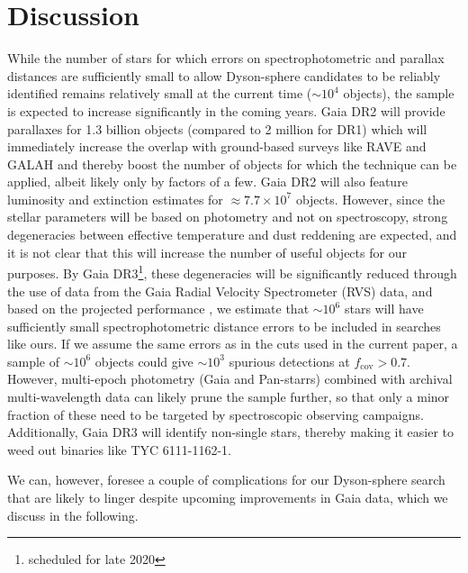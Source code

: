 \documentclass[twocolumn]{aastex6}
\begin{document}
\section{Discussion}
\label{discussion}
While the number of stars for which errors on spectrophotometric and parallax distances are sufficiently small to allow Dyson-sphere candidates to be reliably identified remains relatively small at the current time ($\sim 10^4$ objects), the sample is expected to increase significantly in the coming years. Gaia DR2 will provide parallaxes for 1.3 billion objects (compared to 2 million for DR1) which will immediately increase the overlap with ground-based surveys like RAVE and GALAH and thereby boost the number of objects for which the technique can be applied, albeit likely only by factors of a few. Gaia DR2 will also feature luminosity and extinction estimates for $\approx 7.7\times 10^7$ objects. However, since the stellar parameters will be based on photometry and not on spectroscopy, strong degeneracies between effective temperature and dust reddening are expected, and it is not clear that this will increase the number of useful objects for our purposes. By Gaia DR3\footnote{scheduled for late 2020}, these degeneracies will be significantly reduced through the use of data from the Gaia Radial Velocity Spectrometer (RVS) data, and based on the projected performance \citep{Recio_Blanco16,Dafonte16}, we estimate that $\sim 10^6$ stars will have sufficiently small spectrophotometric distance errors to be included in searches like ours. If we assume the same errors as in the cuts used in the current paper, a sample of $\sim 10^6$ objects could give $\sim 10^3$ spurious detections at $f_\mathrm{cov}>0.7$. However, multi-epoch photometry (Gaia and Pan-starrs) combined with archival multi-wavelength data can likely prune the sample further, so that only a minor fraction of these need to be targeted by spectroscopic observing campaigns. Additionally, Gaia DR3 will identify non-single stars, thereby making it easier to weed out binaries like TYC 6111-1162-1.  

We can, however, foresee a couple of complications for our Dyson-sphere search that are likely to linger despite upcoming improvements in Gaia data, which we discuss in the following.
\end{document}
